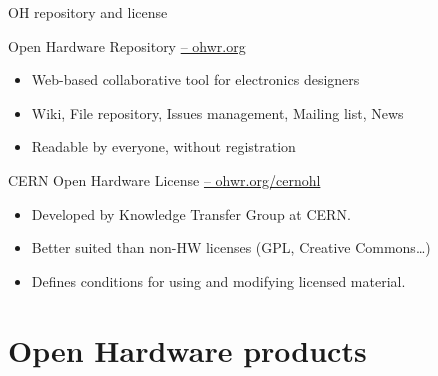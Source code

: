 \documentclass[compress,red]{beamer}
\begin{document}
\begin{frame}{OH repository and license}

  \begin{block}{Open Hardware Repository \href{http://ohwr.org}{-- ohwr.org}}
    \begin{itemize}
    \item Web-based collaborative tool for electronics designers
    \item Wiki, File repository, Issues management, Mailing list, News
    \item Readable by everyone, without registration
   \end{itemize}
  \end{block}

  \begin{block}{CERN Open Hardware License \href{http://ohwr.org/cernohl}{-- ohwr.org/cernohl}}
    \begin{itemize}
    \item Developed by Knowledge Transfer Group at CERN.
    \item Better suited than non-HW licenses (GPL, Creative Commons\dots)
    \item Defines conditions for using and modifying licensed material.
   \end{itemize}
  \end{block}


\end{frame}



\section[OH products]{Open Hardware products}

\subsection*{} %
\end{document}
